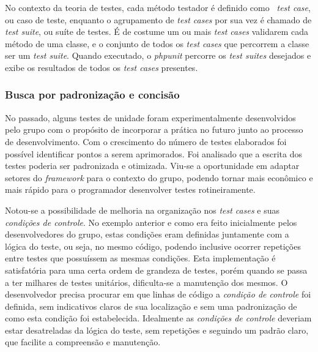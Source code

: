 No contexto da teoria de testes, cada método testador é definido como \emph{~test case}, ou caso de teste, enquanto o agrupamento de \emph{test cases} por sua vez é chamado de \emph{test suite}, ou suíte de testes. É de costume um ou mais \emph{test cases} validarem cada método de uma classe, e o conjunto de todos os \emph{test cases} que percorrem a classe ser um \emph{test suite}. Quando executado, o \emph{phpunit} percorre os \emph{test suites} desejados e exibe os resultados de todos os \emph{test cases} presentes.

\hypertarget{busca-por-padronizacao-e-concisao}{%
\subsubsection{Busca por padronização e concisão}\label{busca-por-padronizacao-e-concisao}}

No passado, alguns testes de unidade foram experimentalmente desenvolvidos pelo grupo com o propósito de incorporar a prática no futuro junto ao processo de desenvolvimento. Com o crescimento do número de testes elaborados foi possível identificar pontos a serem aprimorados. Foi analisado que a escrita dos testes poderia ser padronizada e otimizada. Viu-se a oportunidade em adaptar setores do \emph{framework} para o contexto do grupo, podendo tornar mais econômico e mais rápido para o programador desenvolver testes rotineiramente.

Notou-se a possibilidade de melhoria na organização nos \emph{test cases} e suas \emph{condições de controle}. No exemplo anterior e como era feito inicialmente pelos desenvolvedores do grupo, estas condições eram definidas juntamente com a lógica do teste, ou seja, no mesmo código, podendo inclusive ocorrer repetições entre testes que possuíssem as mesmas condições. Esta implementação é satisfatória para uma certa ordem de grandeza de testes, porém quando se passa a ter milhares de testes unitários, dificulta-se a manutenção dos mesmos. O desenvolvedor precisa procurar em que linhas de código a \emph{condição de controle} foi definida, sem indicativos claros de sua localização e sem uma padronização de como esta condição foi estabelecida. Idealmente as \emph{condições de controle} deveriam estar desatreladas da lógica do teste, sem repetições e seguindo um padrão claro, que facilite a compreensão e manutenção.


